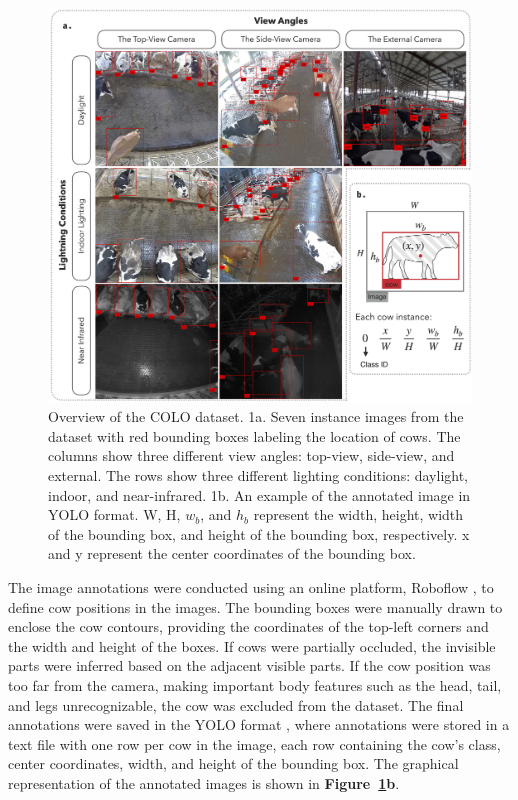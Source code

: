 \begin{figure}[!t]
    \centerline{\includegraphics[width=\columnwidth]{figure_1.jpg}}
    \caption{Overview of the COLO dataset. 1a. Seven instance images from the dataset with red bounding boxes labeling the location of cows. The columns show three different view angles: top-view, side-view, and external. The rows show three different lighting conditions: daylight, indoor, and near-infrared. 1b. An example of the annotated image in YOLO format. W, H, $w_b$, and $h_b$ represent the width, height, width of the bounding box, and height of the bounding box, respectively. x and y represent the center coordinates of the bounding box.}
    \label{fig:dataset}
\end{figure}
The image annotations were conducted using an online platform, Roboflow \cite{roboflow2023}, to define cow positions in the images. The bounding boxes were manually drawn to enclose the cow contours, providing the coordinates of the top-left corners and the width and height of the boxes. If cows were partially occluded, the invisible parts were inferred based on the adjacent visible parts. If the cow position was too far from the camera, making important body features such as the head, tail, and legs unrecognizable, the cow was excluded from the dataset. The final annotations were saved in the YOLO format \cite{ultralytics2023datasets}, where annotations were stored in a text file with one row per cow in the image, each row containing the cow's class, center coordinates, width, and height of the bounding box. The graphical representation of the annotated images is shown in \textbf{Figure~\ref{fig:dataset}b}.

